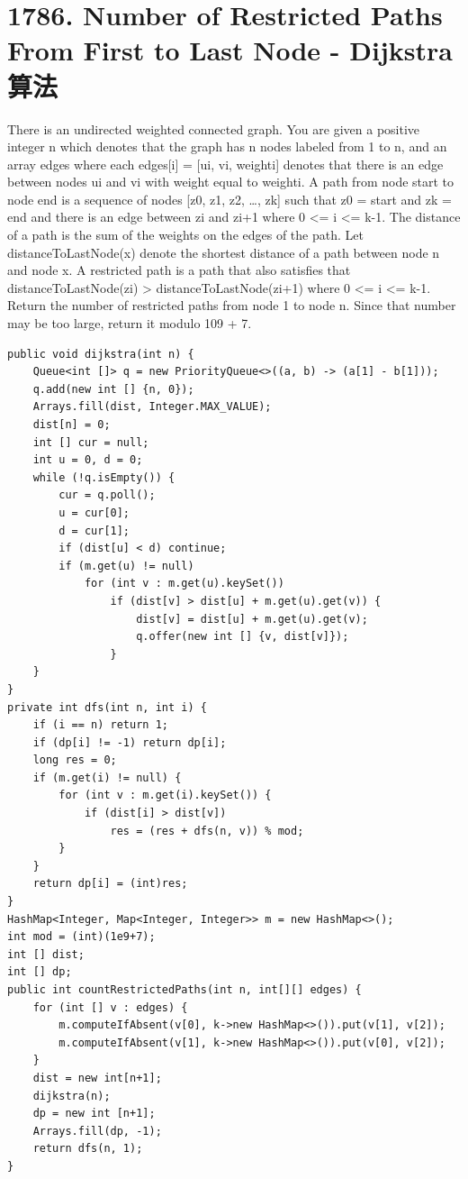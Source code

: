 \documentclass[9pt, b5paaper]{book}
\begin{document}
\section{1786. Number of Restricted Paths From First to Last Node - Dijkstra算法}
\label{sec-1-18}
There is an undirected weighted connected graph. You are given a positive integer n which denotes that the graph has n nodes labeled from 1 to n, and an array edges where each edges[i] = [ui, vi, weighti] denotes that there is an edge between nodes ui and vi with weight equal to weighti.
A path from node start to node end is a sequence of nodes [z0, z1, z2, \ldots{}, zk] such that z0 = start and zk = end and there is an edge between zi and zi+1 where 0 <= i <= k-1.
The distance of a path is the sum of the weights on the edges of the path. Let distanceToLastNode(x) denote the shortest distance of a path between node n and node x. A restricted path is a path that also satisfies that distanceToLastNode(zi) > distanceToLastNode(zi+1) where 0 <= i <= k-1.
Return the number of restricted paths from node 1 to node n. Since that number may be too large, return it modulo 109 + 7.
\begin{verbatim}
public void dijkstra(int n) {
    Queue<int []> q = new PriorityQueue<>((a, b) -> (a[1] - b[1]));
    q.add(new int [] {n, 0});
    Arrays.fill(dist, Integer.MAX_VALUE);
    dist[n] = 0;
    int [] cur = null;
    int u = 0, d = 0;
    while (!q.isEmpty()) {
        cur = q.poll();
        u = cur[0];
        d = cur[1];
        if (dist[u] < d) continue;
        if (m.get(u) != null) 
            for (int v : m.get(u).keySet()) 
                if (dist[v] > dist[u] + m.get(u).get(v)) {
                    dist[v] = dist[u] + m.get(u).get(v);
                    q.offer(new int [] {v, dist[v]});
                }
    }
}
private int dfs(int n, int i) { 
    if (i == n) return 1;
    if (dp[i] != -1) return dp[i];
    long res = 0;
    if (m.get(i) != null) {
        for (int v : m.get(i).keySet()) {
            if (dist[i] > dist[v])
                res = (res + dfs(n, v)) % mod;
        }
    }
    return dp[i] = (int)res;
}
HashMap<Integer, Map<Integer, Integer>> m = new HashMap<>();
int mod = (int)(1e9+7);
int [] dist;
int [] dp;
public int countRestrictedPaths(int n, int[][] edges) {
    for (int [] v : edges) {
        m.computeIfAbsent(v[0], k->new HashMap<>()).put(v[1], v[2]);
        m.computeIfAbsent(v[1], k->new HashMap<>()).put(v[0], v[2]);
    }
    dist = new int[n+1];
    dijkstra(n);
    dp = new int [n+1];
    Arrays.fill(dp, -1);
    return dfs(n, 1);
}
\end{verbatim}
\end{document}
